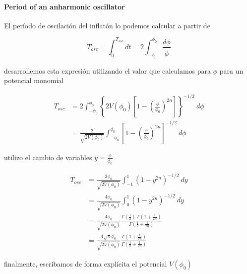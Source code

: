 \paragraph{Period of an anharmonic oscillator}\label{Periodo_Floquet}

El período de oscilación del inflatón lo podemos calcular a partir de

\begin{equation}
    T_{osc} = \int_0^{T_{osc}} dt = 2 \int_{- \phi_0}^{\phi_0} \frac{d\phi}{\dot{\phi}}
\end{equation}

\noindent
desarrollemos esta expresión utilizando el valor que calculamos para $\dot{\phi}$ para un potencial monomial

\begin{equation*}
    \begin{split}
        T_{osc} &= 2 \int_{- \phi_0}^{\phi_0} \left\{ 2 V(\phi_0) \left[1 - \left(\frac{\phi}{\phi_0} \right)^{2n} \right] \right\}^{-1/2} \ d\phi\\
        &= \frac{2}{\sqrt{2 V(\phi_0)}} \int_{- \phi_0}^{\phi_0} \left[ 1 - \left( \frac{\phi}{\phi_0} \right)^{2n} \right]^{-1/2} \ d\phi
    \end{split}
\end{equation*}

\noindent
utilizo el cambio de variables $\displaystyle y = \frac{\phi}{\phi_0}$

\begin{equation*}
    \begin{split}
        T_{osc} &= \frac{2 \phi_0}{\sqrt{2 V(\phi_0)}} \int_{-1}^1 \left( 1 - y^{2n} \right)^{-1/2} \ dy\\
        &= \frac{4 \phi_0}{\sqrt{2 V(\phi_0)}} \int_0^1 \left( 1 - y^{2n} \right)^{- 1/2} \ dy\\
        &= \frac{4 \phi_0}{\sqrt{2 V(\phi_0)}} \frac{\displaystyle \Gamma \left( \frac{1}{2} \right) \ \Gamma \left( 1 + \frac{1}{2n} \right)}{\displaystyle \Gamma \left( \frac{1}{2} + \frac{1}{2n} \right)}\\
        &= \frac{4 \sqrt{\pi} \phi_0}{\sqrt{2 V(\phi_0)}} \frac{\displaystyle \Gamma \left( 1 + \frac{1}{2n} \right)}{\displaystyle \Gamma \left( \frac{1}{2} + \frac{1}{2n} \right)}
    \end{split}
\end{equation*}

\noindent
finalmente, escribamos de forma explícita el potencial $V(\phi_0)$

